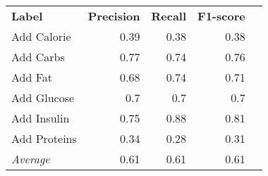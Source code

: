 \begin{tabular}{lrrrr}
    \textbf{Label} & \textbf{Precision} & \textbf{Recall} & \textbf{F1-score} \\
    Add Calorie & 0.39 & 0.38 & 0.38 \\
    Add Carbs & 0.77 & 0.74 & 0.76 \\
    Add Fat & 0.68 & 0.74 & 0.71 \\
    Add Glucose & 0.7 & 0.7 & 0.7 \\
    Add Insulin & 0.75 & 0.88 & 0.81 \\
    Add Proteins & 0.34 & 0.28 & 0.31 \\
    \emph{Average} & 0.61 & 0.61 & 0.61 \\
\end{tabular}
